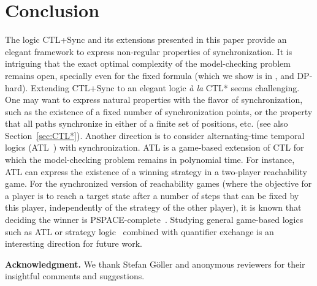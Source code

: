 \documentclass{article}
\begin{document}
\section{Conclusion}

The logic CTL+Sync and its extensions presented in this paper provide an elegant 
framework to express non-regular properties of synchronization. 
It is intriguing that the exact optimal complexity of the model-checking problem remains open,
specially even for the fixed formula  (which we show is in ,
and DP-hard).
Extending CTL+Sync to an elegant logic \emph{\`{a} la} CTL* seems challenging.
One may want to express natural properties with the flavor of synchronization, such as the 
existence of a fixed number of synchronization points, or the property that all 
paths synchronize in either of a finite set of positions, etc. (see also Section~\ref{sec:CTL*}).
Another direction is to consider alternating-time temporal logics (ATL~\cite{AHK02})
with synchronization. ATL is a game-based extension of CTL for which the 
model-checking problem remains in polynomial time. For instance, ATL can express the existence
of a winning strategy in a two-player reachability game. For the synchronized version of 
reachability games (where the objective for a player is to reach a target
state after a number of steps that can be fixed by this player, independently of the
strategy of the other player), it is known that deciding the winner is PSPACE-complete~\cite{DMS14a}.
Studying general game-based logics such as ATL or strategy logic~\cite{CHP10} 
combined with quantifier exchange is an interesting direction for future work.\medskip



{\bf Acknowledgment.} We thank Stefan G\"oller and anonymous reviewers for 
their insightful comments and suggestions.





 
\end{document}
